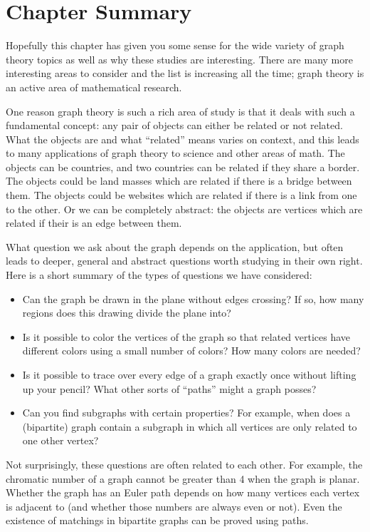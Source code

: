 \documentclass[12pt]{article}
\begin{document}
\section{Chapter Summary}\label{sec:gt-conc}

Hopefully this chapter has given you some sense for the wide variety of graph theory topics as well as why these studies are interesting.  There are many more interesting areas to consider and the list is increasing all the time; graph theory is an active area of mathematical research.

One reason graph theory is such a rich area of study is that it deals with such a fundamental concept: any pair of objects can either be related or not related.  What the objects are and what ``related'' means varies on context, and this leads to many applications of graph theory to science and other areas of math.  The objects can be countries, and two countries can be related if they share a border.  The objects could be land masses which are related if there is a bridge between them.  The objects could be websites which are related if there is a link from one to the other.  Or we can be completely abstract: the objects are vertices which are related if their is an edge between them.

What question we ask about the graph depends on the application, but often leads to deeper, general and abstract questions worth studying in their own right.  Here is a short summary of the types of questions we have considered:

\begin{itemize}
\item Can the graph be drawn in the plane without edges crossing?  If so, how many regions does this drawing divide the plane into?
\item Is it possible to color the vertices of the graph so that related vertices have different colors using a small number of colors?  How many colors are needed?
\item Is it possible to trace over every edge of a graph exactly once without lifting up your pencil?  What other sorts of ``paths'' might a graph posses?
\item Can you find subgraphs with certain properties?  For example, when does a (bipartite) graph contain a subgraph in which all vertices are only related to one other vertex?
\end{itemize}

Not surprisingly, these questions are often related to each other.  For example, the chromatic number of a graph cannot be greater than 4 when the graph is planar.  Whether the graph has an Euler path depends on how many vertices each vertex is adjacent to (and whether those numbers are always even or not).  Even the existence of matchings in bipartite graphs can be proved using paths.
\end{document}

